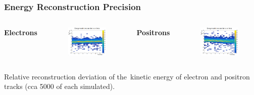 \documentclass{beamer}
\begin{document}
	\begin{frame}
		\frametitle{Energy Reconstruction Precision}
		\centering
		\begin{columns}
			\centering
			\Large \textbf{Electrons}
			\begin{figure}
				\centering
				\includegraphics[width = 0.95 \linewidth]{../images/h_e_deltaenergy_theta.png}
			\end{figure}
			\centering
			\Large \textbf{Positrons}
			\begin{figure}
				\centering
				\includegraphics[width = 0.95 \linewidth]{../images/h_p_deltaenergy_theta.png}
			\end{figure}
		\end{columns}
		\vspace{0.5cm}
		\footnotesize{Relative reconstruction deviation of the~kinetic energy of electron and positron tracks (cca 5000 of each simulated).}
	\end{frame}
	
\end{document}
